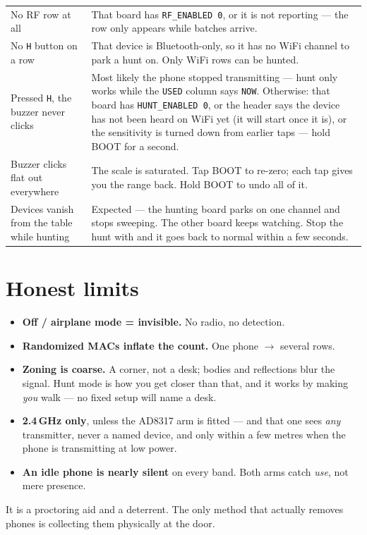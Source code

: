\documentclass[11pt]{article}
\newcommand{\key}[1]{\fbox{\ttfamily #1}}
\begin{document}
\begin{center}
\begin{tabular}{@{}p{5.3cm}p{9cm}@{}}
No RF row at all & That board has \texttt{RF\_ENABLED 0}, or it is not reporting
--- the row only appears while batches arrive.\\
No \texttt{H} button on a row & That device is Bluetooth-only, so it has no WiFi
channel to park a hunt on. Only WiFi rows can be hunted.\\
Pressed \texttt{H}, the buzzer never clicks & Most likely the phone stopped
transmitting --- hunt only works while the \texttt{USED} column says
\texttt{NOW}. Otherwise: that board has \texttt{HUNT\_ENABLED 0}, or the header
says the device has not been heard on WiFi yet (it will start once it is), or the
sensitivity is turned down from earlier taps --- hold BOOT for a second.\\
Buzzer clicks flat out everywhere & The scale is saturated. Tap BOOT to re-zero;
each tap gives you the range back. Hold BOOT to undo all of it.\\
Devices vanish from the table while hunting & Expected --- the hunting board
parks on one channel and stops sweeping. The other board keeps watching. Stop the
hunt with \key{h} and it goes back to normal within a few seconds.\\
\bottomrule
\end{tabular}
\end{center}

\section{Honest limits}

\begin{itemize}
  \item \textbf{Off / airplane mode = invisible.} No radio, no detection.
  \item \textbf{Randomized MACs inflate the count.} One phone $\to$ several rows.
  \item \textbf{Zoning is coarse.} A corner, not a desk; bodies and reflections
        blur the signal. Hunt mode is how you get closer than that, and it works
        by making \emph{you} walk --- no fixed setup will name a desk.
  \item \textbf{2.4\,GHz only}, unless the AD8317 arm is fitted --- and that one
        sees \emph{any} transmitter, never a named device, and only within a few
        metres when the phone is transmitting at low power.
  \item \textbf{An idle phone is nearly silent} on every band. Both arms catch
        \emph{use}, not mere presence.
\end{itemize}

It is a proctoring aid and a deterrent. The only method that actually removes
phones is collecting them physically at the door.
\end{document}
